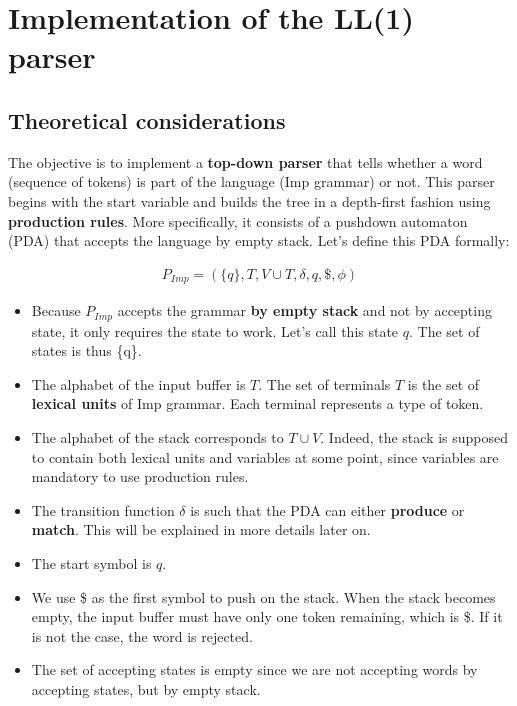 \chapter{Implementation of the LL(1) parser}

\section{Theoretical considerations}

The objective is to implement a \textbf{top-down parser} that tells whether a word (sequence of tokens)
is part of the language (Imp grammar) or not. This parser begins with the start variable and builds the
tree in a depth-first fashion using \textbf{production rules}. More specifically, it consists of a pushdown
automaton (PDA) that accepts the language by empty stack. Let's define this PDA formally:

\begin{equation}
  \begin{split}
    P_{Imp} = (\{q\}, T, V \cup T, \delta, q, \$, \phi)
   \end{split}
\end{equation}

\begin{itemize}
  \item Because $P_{Imp}$ accepts the grammar \textbf{by empty stack} and not by accepting state, it only requires the state to work. 
        Let's call this state $q$. The set of states is thus \{q\}.
  \item The alphabet of the input buffer is $T$. The set of terminals $T$ is the set of \textbf{lexical units} of Imp grammar. 
        Each terminal represents a type of token.
  \item The alphabet of the stack corresponds to $T \cup V$. Indeed, the stack is supposed to contain both lexical units and variables
        at some point, since variables are mandatory to use production rules.
  \item The transition function $\delta$ is such that the PDA can either \textbf{produce} or \textbf{match}. This will be explained
        in more details later on.
  \item The start symbol is $q$.
  \item We use \$ as the first symbol to push on the stack. When the stack becomes empty, the input buffer must have only one token
        remaining, which is \$. If it is not the case, the word is rejected.
  \item The set of accepting states is empty since we are not accepting words by accepting states, but by empty stack.
\end{itemize}

